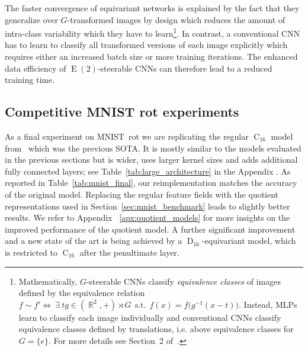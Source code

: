 \documentclass{article}
\newcommand{\apx}{Appendix\xspace
}
\DeclareMathOperator*{\R}{\mathbb{R}}
\newcommand{\E}[1]{\ensuremath{\operatorname{E}(#1)}}
\newcommand{\D}[1]{\ensuremath{\operatorname{D}_{#1}}}
\newcommand{\C}[1]{\ensuremath{\operatorname{C}_{#1}}}
\newlength{\secBefore}
\newlength{\secAfter}
\newlength{\subsecBefore}
\newlength{\subsecAfter}
\begin{document}
The faster convergence of equivariant networks is explained by the fact that they generalize over $G$-transformed images by design which reduces the amount of intra-class variability which they have to learn\footnote{
    Mathematically, $G$-steerable CNNs classify \textit{equivalence classes} of images defined by the equivalence relation
    $f\sim f'\Leftrightarrow\ \exists\ tg\in(\R^2,+)\rtimes G\ \ \text{s.t.}\ \ f(x)=f\big(g^{-1}(x-t)\big)$.
    Instead, MLPs learn to classify each image individually and conventional CNNs classify equivalence classes defined by translations, i.e. above equivalence classes for $G=\{e\}$.
    For more details see Section~2 of~\cite{Weiler2018-STEERABLE}.
}.
In contrast, a conventional CNN has to learn to classify all transformed versions of each image explicitly which requires either an increased batch size or more training iterations.
The enhanced data efficiency of $\E2$-steerable CNNs can therefore lead to a reduced training time.



\vspace*{\subsecBefore}
\subsection{Competitive MNIST rot experiments}
\label{sec:mnist_rot}
\vspace*{\subsecAfter}

As a final experiment on MNIST~rot we are replicating the regular $\C{16}$ model from~\cite{Weiler2018-STEERABLE} which was the previous SOTA.
It is mostly similar to the models evaluated in the previous sections but is wider, uses larger kernel sizes and adds additional fully connected layers; see Table~\ref{tab:large_architecture} in the \apx.
As reported in Table~\ref{tab:mnist_final}, our reimplementation matches the accuracy of the original model.
Replacing the regular feature fields with the quotient representations used in Section~\ref{sec:mnist_benchmark} leads to slightly better results.
We refer to \apx~\ref{apx:quotient_models} for more insights on the improved performance of the quotient model.
A further significant improvement and a new state of the art is being achieved by a $\D{16}$-equivariant model, which is restricted to $\C{16}$ after the penultimate layer.
\end{document}
